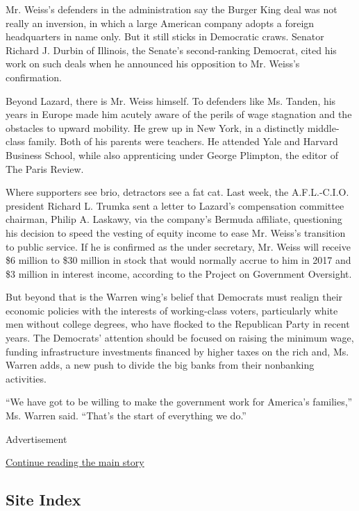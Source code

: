 Mr. Weiss's defenders in the administration say the Burger King deal was
not really an inversion, in which a large American company adopts a
foreign headquarters in name only. But it still sticks in Democratic
craws. Senator Richard J. Durbin of Illinois, the Senate's
second-ranking Democrat, cited his work on such deals when he announced
his opposition to Mr. Weiss's confirmation.

Beyond Lazard, there is Mr. Weiss himself. To defenders like Ms. Tanden,
his years in Europe made him acutely aware of the perils of wage
stagnation and the obstacles to upward mobility. He grew up in New York,
in a distinctly middle-class family. Both of his parents were teachers.
He attended Yale and Harvard Business School, while also apprenticing
under George Plimpton, the editor of The Paris Review.

Where supporters see brio, detractors see a fat cat. Last week, the
A.F.L.-C.I.O. president Richard L. Trumka sent a letter to Lazard's
compensation committee chairman, Philip A. Laskawy, via the company's
Bermuda affiliate, questioning his decision to speed the vesting of
equity income to ease Mr. Weiss's transition to public service. If he is
confirmed as the under secretary, Mr. Weiss will receive \$6 million to
\$30 million in stock that would normally accrue to him in 2017 and \$3
million in interest income, according to the Project on Government
Oversight.

But beyond that is the Warren wing's belief that Democrats must realign
their economic policies with the interests of working-class voters,
particularly white men without college degrees, who have flocked to the
Republican Party in recent years. The Democrats' attention should be
focused on raising the minimum wage, funding infrastructure investments
financed by higher taxes on the rich and, Ms. Warren adds, a new push to
divide the big banks from their nonbanking activities.

``We have got to be willing to make the government work for America's
families,'' Ms. Warren said. ``That's the start of everything we do.''

Advertisement

\protect\hyperlink{after-bottom}{Continue reading the main story}

\hypertarget{site-index}{%
\subsection{Site Index}\label{site-index}}

